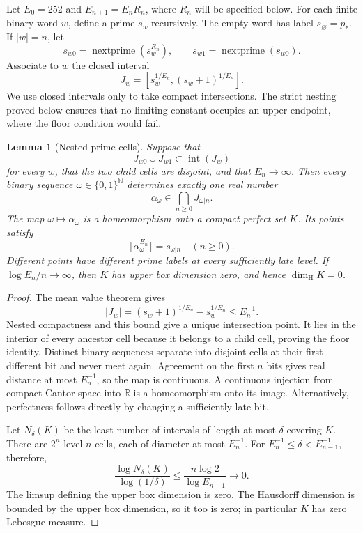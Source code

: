 \documentclass[11pt,a4paper]{article}
\newtheorem{lemma}[theorem]{Lemma}
\theoremstyle{definition}
\theoremstyle{remark}
\numberwithin{equation}{section}
\begin{document}
Let $E_0=252$ and $E_{n+1}=E_nR_n$, where $R_n$ will be specified below.
For each finite binary word $w$, define a prime $s_w$ recursively.  The
empty word has label $s_{\varnothing}=p_*$.  If $|w|=n$, let
\[
 s_{w0}=\operatorname{nextprime}(s_w^{R_n}),
 \qquad
 s_{w1}=\operatorname{nextprime}(s_{w0}).
\]
Associate to $w$ the closed interval
\begin{equation}
\label{enc:eq:binary-root-cell}
 J_w=[s_w^{1/E_n},(s_w+1)^{1/E_n}].
\end{equation}
We use closed intervals only to take compact intersections.  The strict
nesting proved below ensures that no limiting constant occupies an upper
endpoint, where the floor condition would fail.

\begin{lemma}[Nested prime cells]
\label{enc:lem:binary-topology}
Suppose that
\[
 J_{w0}\cup J_{w1}\subset\operatorname{int}(J_w)
\]
for every $w$, that the two child cells are disjoint, and that $E_n\to\infty$.
Then every binary sequence $\omega\in\{0,1\}^{\mathbb N}$ determines exactly
one real number
\[
 \alpha_\omega\in\bigcap_{n\ge0}J_{\omega|n}.
\]
The map $\omega\mapsto\alpha_\omega$ is a homeomorphism onto a compact
perfect set $K$.  Its points satisfy
\[
 \lfloor\alpha_\omega^{E_n}\rfloor=s_{\omega|n}
 \quad(n\ge0).
\]
Different points have different prime labels at every sufficiently late
level.  If $\log E_n/n\to\infty$, then $K$ has upper box dimension zero,
and hence $\dim_{\mathrm H}K=0$.
\end{lemma}

\begin{proof}
The mean value theorem gives
\[
 |J_w|=(s_w+1)^{1/E_n}-s_w^{1/E_n}\le E_n^{-1}.
\]
Nested compactness and this bound give a unique intersection point.
It lies in the interior of every ancestor cell because it belongs to a
child cell, proving the floor identity.  Distinct binary sequences
separate into disjoint cells at their first different bit and never meet
again.  Agreement on the first $n$ bits gives real distance at most
$E_n^{-1}$, so the map is continuous.  A continuous injection from compact
Cantor space into $\mathbb R$ is a homeomorphism onto its image.  Alternatively,
perfectness follows directly by changing a sufficiently late bit.

Let $N_\delta(K)$ be the least number of intervals of length at most
$\delta$ covering $K$.  There are $2^n$ level-$n$ cells, each of diameter
at most $E_n^{-1}$.  For $E_n^{-1}\le\delta<E_{n-1}^{-1}$, therefore,
\[
 \frac{\log N_\delta(K)}{\log(1/\delta)}
 \le\frac{n\log2}{\log E_{n-1}}\longrightarrow0.
\]
The limsup defining the upper box dimension is zero.  The Hausdorff
dimension is bounded by the upper box dimension, so it too is zero;
in particular $K$ has zero Lebesgue measure.
\end{proof}
\end{document}
